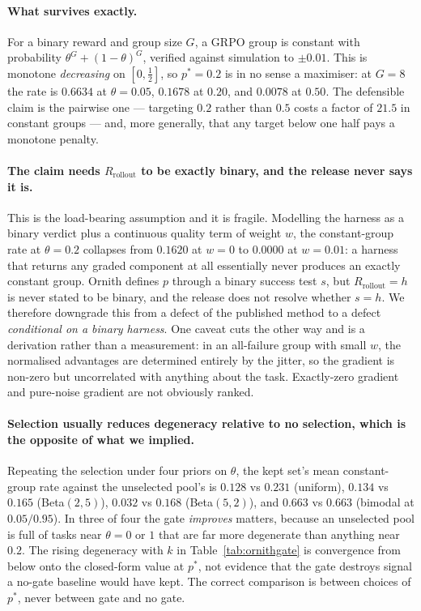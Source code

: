 \paragraph{What survives exactly.} For a binary reward and group size $G$, a GRPO group is
constant with probability $\theta^G+(1-\theta)^G$, verified against simulation to
$\pm0.01$. This is monotone \emph{decreasing} on $[0,\tfrac12]$, so $p^*=0.2$ is in no
sense a maximiser: at $G=8$ the rate is $0.6634$ at $\theta=0.05$, $0.1678$ at $0.20$, and
$0.0078$ at $0.50$. The defensible claim is the pairwise one --- targeting $0.2$ rather
than $0.5$ costs a factor of $21.5$ in constant groups --- and, more generally, that any
target below one half pays a monotone penalty.

\paragraph{The claim needs $R_{\mathrm{rollout}}$ to be exactly binary, and the release
never says it is.} This is the load-bearing assumption and it is fragile. Modelling the
harness as a binary verdict plus a continuous quality term of weight $w$, the constant-group
rate at $\theta=0.2$ collapses from $0.1620$ at $w=0$ to $0.0000$ at $w=0.01$: a harness
that returns any graded component at all essentially never produces an exactly constant
group. Ornith defines $p$ through a binary success test $s$, but $R_{\mathrm{rollout}}=h$
is never stated to be binary, and the release does not resolve whether $s=h$. We therefore
downgrade this from a defect of the published method to a defect \emph{conditional on a
binary harness}. One caveat cuts the other way and is a derivation rather than a
measurement: in an all-failure group with small $w$, the normalised advantages are
determined entirely by the jitter, so the gradient is non-zero but uncorrelated with
anything about the task. Exactly-zero gradient and pure-noise gradient are not obviously
ranked.

\paragraph{Selection usually reduces degeneracy relative to no selection, which is the
opposite of what we implied.} Repeating the selection under four priors on $\theta$, the
kept set's mean constant-group rate against the unselected pool's is $0.128$ vs $0.231$
(uniform), $0.134$ vs $0.165$ (Beta$(2,5)$), $0.032$ vs $0.168$ (Beta$(5,2)$), and $0.663$
vs $0.663$ (bimodal at $0.05/0.95$). In three of four the gate \emph{improves} matters,
because an unselected pool is full of tasks near $\theta=0$ or $1$ that are far more
degenerate than anything near $0.2$. The rising degeneracy with $k$ in
Table~\ref{tab:ornithgate} is convergence from below onto the closed-form value at $p^*$,
not evidence that the gate destroys signal a no-gate baseline would have kept. The correct
comparison is between choices of $p^*$, never between gate and no gate.

